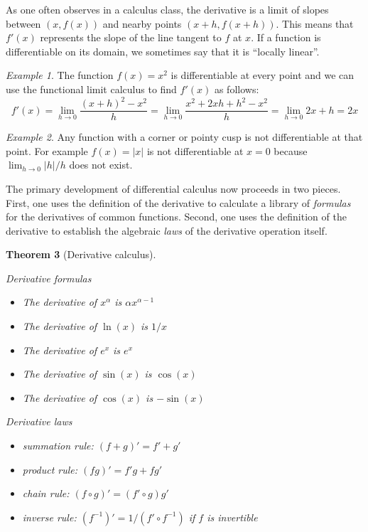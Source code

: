 \documentclass[11pt,oneside]{amsbook}
\theoremstyle{definition}
\theoremstyle{plain}
\newtheorem{theorem}{Theorem}[section]
\theoremstyle{definition}
\theoremstyle{remark}
\newtheorem{example}[theorem]{Example}
\numberwithin{equation}{section}
\numberwithin{figure}{section}
\begin{document}
As one often observes in a calculus class, the derivative is a limit of slopes between $(x,f(x))$ and nearby points $(x+h,f(x+h))$. This means that $f'(x)$ represents the slope of the line tangent to $f$ at $x$. If a function is differentiable on its domain, we sometimes say that it is ``locally linear''.

\begin{example}
  The function $f(x)=x^2$ is differentiable at every point and we can use the functional limit calculus to find $f'(x)$ as follows:
  \[f'(x)=\lim_{h\to0}\frac{(x+h)^2-x^2}{h}
  =\lim_{h\to0}\frac{x^2+2xh+h^2-x^2}{h}=\lim_{h\to0}2x+h=2x
  \]
\end{example}

\begin{example}
  Any function with a corner or pointy cusp is not differentiable at that point. For example $f(x)=|x|$ is not differentiable at $x=0$ because $\lim_{h\to0}|h|/h$ does not exist.
\end{example}

The primary development of differential calculus now proceeds in two pieces. First, one uses the definition of the derivative to calculate a library of \emph{formulas} for the derivatives of common functions. Second, one uses the definition of the derivative to establish the algebraic \emph{laws} of the derivative operation itself.

\begin{theorem}[Derivative calculus]\ 

  Derivative formulas
  \begin{itemize}
  \item The derivative of $x^\alpha$ is $\alpha x^{\alpha-1}$
  \item The derivative of $\ln(x)$ is $1/x$
  \item The derivative of $e^x$ is $e^x$
  \item The derivative of $\sin(x)$ is $\cos(x)$
  \item The derivative of $\cos(x)$ is $-\sin(x)$
  \end{itemize}

  Derivative laws
  \begin{itemize}
  \item summation rule: $(f+g)'=f'+g'$
  \item product rule: $(fg)'=f'g+fg'$
  \item chain rule: $(f\circ g)'=(f'\circ g)g'$
  \item inverse rule: $(f^{-1})'=1/(f'\circ f^{-1})$ if $f$ is invertible
  \end{itemize}
\end{theorem}
\end{document}
